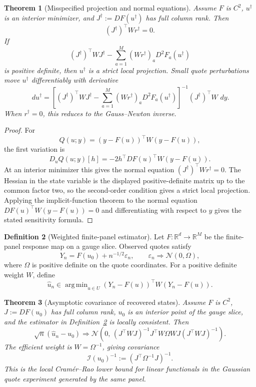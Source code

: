 \documentclass[11pt,a4paper]{amsart}
\theoremstyle{plain}
\newtheorem{theorem}{Theorem}[section]
\theoremstyle{definition}
\newtheorem{definition}[theorem]{Definition}
\theoremstyle{remark}
\DeclareMathOperator{\argmin}{arg\,min}
\newcommand{\R}{\mathbb{R}}
\newcommand{\dd}{\,d}
\newcommand{\eps}{\varepsilon}
\begin{document}
\begin{theorem}[Misspecified projection and normal equations]\label{thm:misspecified-projection}
Assume \(F\) is \(C^2\), \(u^\dagger\) is an interior minimizer, and
\(J^\dagger:=DF(u^\dagger)\) has full column rank.  Then
\[
        (J^\dagger)^\top W r^\dagger=0.
\]
If
\[
        (J^\dagger)^\top WJ^\dagger
        -
        \sum_{a=1}^M (Wr^\dagger)_aD^2F_a(u^\dagger)
\]
is positive definite, then \(u^\dagger\) is a strict local projection.  Small quote perturbations
move \(u^\dagger\) differentiably with derivative
\[
        \dd u^\dagger
        =
        \left[
        (J^\dagger)^\top WJ^\dagger
        -
        \sum_{a=1}^M (Wr^\dagger)_aD^2F_a(u^\dagger)
        \right]^{-1}
        (J^\dagger)^\top W\,\dd y .
\]
When \(r^\dagger=0\), this reduces to the Gauss--Newton inverse.
\end{theorem}

\begin{proof}
For
\[
        Q(u;y)=(y-F(u))^\top W(y-F(u)),
\]
the first variation is
\[
        D_uQ(u;y)[h]
        =
        -2h^\top DF(u)^\top W(y-F(u)).
\]
At an interior minimizer this gives the normal equation
\((J^\dagger)^\top Wr^\dagger=0\).  The Hessian in the state variable is the displayed
positive-definite matrix up to the common factor two, so the second-order condition gives a strict
local projection.  Applying the implicit-function theorem to the normal equation
\(DF(u)^\top W(y-F(u))=0\) and differentiating with respect to \(y\) gives the stated sensitivity
formula.
\end{proof}

\begin{definition}[Weighted finite-panel estimator]\label{def:weighted-finite-panel-estimator}
Let \(F:\R^d\to\R^M\) be the finite-panel response map on a gauge slice.  Observed quotes satisfy
\[
        Y_n=F(u_0)+n^{-1/2}\eps_n,
        \qquad
        \eps_n\Rightarrow \mathcal N(0,\Omega),
\]
where \(\Omega\) is positive definite on the quote coordinates.  For a positive definite weight
\(W\), define
\[
        \widehat u_n
        \in
        \argmin_{u\in U}(Y_n-F(u))^\top W(Y_n-F(u)).
\]
\end{definition}

\begin{theorem}[Asymptotic covariance of recovered states]\label{thm:asymptotic-recovery-covariance}
Assume \(F\) is \(C^2\), \(J:=DF(u_0)\) has full column rank, \(u_0\) is an interior point of the
gauge slice, and the estimator in Definition~\ref{def:weighted-finite-panel-estimator} is
locally consistent.  Then
\[
        \sqrt n(\widehat u_n-u_0)
        \Rightarrow
        \mathcal N\!\left(
        0,\,
        (J^\top WJ)^{-1}J^\top W\Omega WJ(J^\top WJ)^{-1}
        \right).
\]
The efficient weight is \(W=\Omega^{-1}\), giving covariance
\[
        \mathcal I(u_0)^{-1}
        :=
        (J^\top\Omega^{-1}J)^{-1}.
\]
This is the local Cram\'er--Rao lower bound for linear functionals in the Gaussian quote
experiment generated by the same panel.
\end{theorem}
\end{document}
